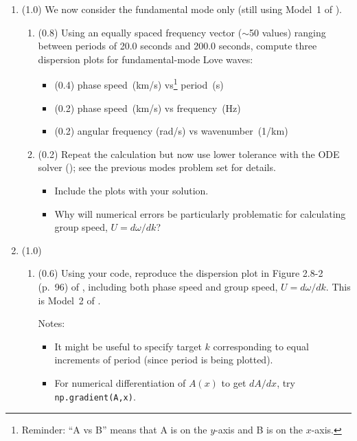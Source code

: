 \documentclass[11pt,titlepage,fleqn]{article}
\begin{document}
\begin{enumerate}

\item (1.0) We now consider the fundamental mode only (still using Model~1 of ).

\begin{enumerate}
\item (0.8) Using an equally spaced frequency vector ($\sim$50 values) ranging between periods of 20.0 seconds and 200.0 seconds, compute three dispersion plots for fundamental-mode Love waves:
%
\begin{itemize}
\item (0.4) phase speed~(km/s) vs\footnote{Reminder: ``A vs B'' means that A is on the $y$-axis and B is on the $x$-axis.} period~(s)
\item (0.2) phase speed~(km/s) vs frequency~(Hz)
\item (0.2) angular frequency (rad/s) vs wavenumber~(1/km)
\end{itemize}

\item (0.2) Repeat the calculation but now use lower tolerance with the ODE solver (\sfind); see the previous modes problem set for details.
%
\begin{itemize}
\item Include the plots with your solution.
\item Why will numerical errors be particularly problematic for calculating group speed, $U = d\omega/dk$?
\end{itemize}

\end{enumerate}


\item (1.0)
%
\begin{enumerate}
\item (0.6) Using your code, reproduce the dispersion plot in Figure 2.8-2 (p.~96) of \citet{SteinWysession}, including both phase speed and group speed, $U = d\omega/dk$. This is Model~2 of .

Notes:
%
\begin{itemize}
\item It might be useful to specify target $k$ corresponding to equal increments of period (since period is being plotted).
\item For numerical differentiation of $A(x)$ to get $dA/dx$, try \verb+np.gradient(A,x)+.
\end{itemize}


\end{enumerate}
\end{enumerate}
\end{document}
